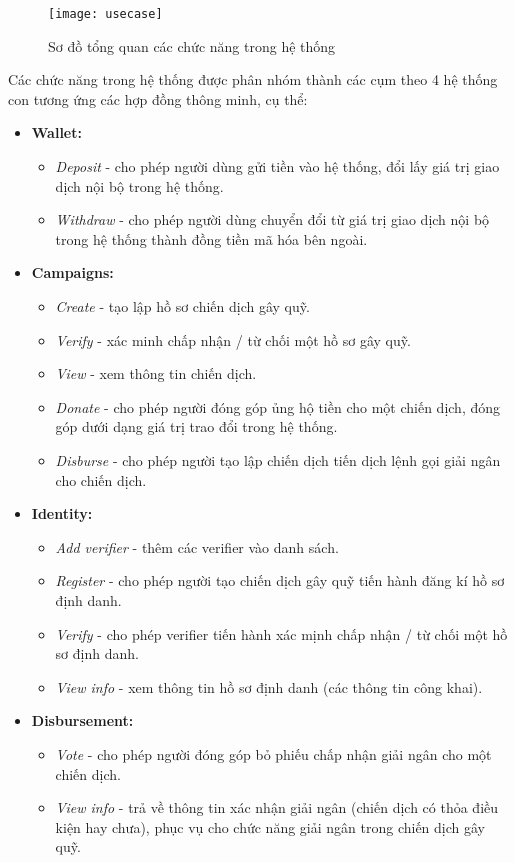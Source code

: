 \documentclass[../main-report.tex]{subfiles}
\begin{document}
\begin{figure}[ht!]
\begin{center}
\label{fig:usecase-diagram}
\texttt{[image: usecase]}
\caption{Sơ đồ tổng quan các chức năng trong hệ thống}
\end{center}
\end{figure}

Các chức năng trong hệ thống được phân nhóm thành các cụm theo 4 hệ thống con tương ứng các hợp đồng thông minh, cụ thể:

\begin{itemize}
\item \textbf{Wallet:}
\begin{itemize}
\item \textit{Deposit} - cho phép người dùng gửi tiền vào hệ thống, đổi lấy giá trị giao dịch nội bộ trong hệ thống.
\item \textit{Withdraw} - cho phép người dùng chuyển đổi từ giá trị giao dịch nội bộ trong hệ thống thành đồng tiền mã hóa bên ngoài.
\end{itemize}
\item \textbf{Campaigns:}
\begin{itemize}
\item \textit{Create} - tạo lập hồ sơ chiến dịch gây quỹ.
\item \textit{Verify} - xác minh chấp nhận / từ chối một hồ sơ gây quỹ.
\item \textit{View} - xem thông tin chiến dịch.
\item \textit{Donate} - cho phép người đóng góp ủng hộ tiền cho một chiến dịch, đóng góp dưới dạng giá trị trao đổi trong hệ thống.
\item \textit{Disburse} - cho phép người tạo lập chiến dịch tiến dịch lệnh gọi giải ngân cho chiến dịch.
\end{itemize}
\item \textbf{Identity:}
\begin{itemize}
\item \textit{Add verifier} - thêm các verifier vào danh sách.
\item \textit{Register} - cho phép người tạo chiến dịch gây quỹ tiến hành đăng kí hồ sơ định danh.
\item \textit{Verify} - cho phép verifier tiến hành xác mịnh chấp nhận / từ chối một hồ sơ định danh.
\item \textit{View info} - xem thông tin hồ sơ định danh (các thông tin công khai). 
\end{itemize}
\item \textbf{Disbursement:}
\begin{itemize}
\item \textit{Vote} - cho phép người đóng góp bỏ phiếu chấp nhận giải ngân cho một chiến dịch.
\item \textit{View info} - trả về thông tin xác nhận giải ngân (chiến dịch có thỏa điều kiện hay chưa), phục vụ cho chức năng giải ngân trong chiến dịch gây quỹ.
\end{itemize}
\end{itemize}
\end{document}
